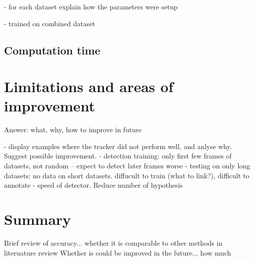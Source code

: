 		- for each dataset explain how the parameters were setup
					
		- trained on combined dataset
	\subsection{Computation time \statusnew}
\section{Limitations and areas of improvement \statusnew}
	\label{sec:results_limitations}
	Answer: what, why, how to improve in future
			
	- display examples where the tracker did not perform well, and anlyse why. Suggest possible improvement.
	- detection training: only first few frames of datasets, not random -- expect to detect later frames worse
	- testing on only long datasets: no data on short datasets. diffucult to train (what to link?), difficult to annotate
	- speed of detector. Reduce number of hypothesis		

\section{Summary \statusnew}
	\label{sec:results_summary}
	Brief review of accuracy... whether it is comparable to other methods in literuature review
	Whether is could be improved in the future... how much